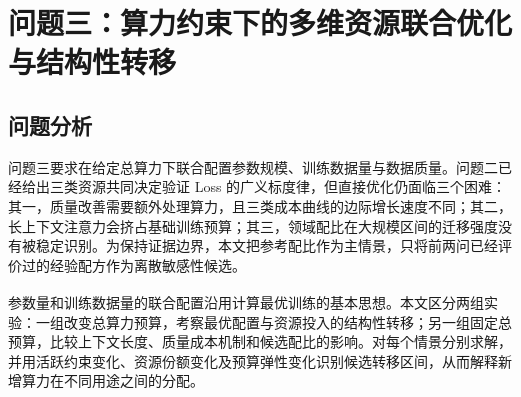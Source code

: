 \documentclass[bwprint]{gmcmthesis}
\numberwithin{equation}{section}
\numberwithin{figure}{section}
\numberwithin{table}{section}
\begin{document}




\section{问题三：算力约束下的多维资源联合优化与结构性转移}

    \subsection{问题分析}

    问题三要求在给定总算力下联合配置参数规模、训练数据量与数据质量。问题二已经给出三类资源共同决定验证 Loss 的广义标度律，但直接优化仍面临三个困难：其一，质量改善需要额外处理算力，且三类成本曲线的边际增长速度不同；其二，长上下文注意力会挤占基础训练预算；其三，领域配比在大规模区间的迁移强度没有被稳定识别。为保持证据边界，本文把参考配比作为主情景，只将前两问已经评价过的经验配方作为离散敏感性候选。

    参数量和训练数据量的联合配置沿用计算最优训练的基本思想\textsuperscript{\cite{hoffmann2022chinchilla}}。本文区分两组实验：一组改变总算力预算，考察最优配置与资源投入的结构性转移；另一组固定总预算，比较上下文长度、质量成本机制和候选配比的影响。对每个情景分别求解，并用活跃约束变化、资源份额变化及预算弹性变化识别候选转移区间，从而解释新增算力在不同用途之间的分配。
\end{document}
